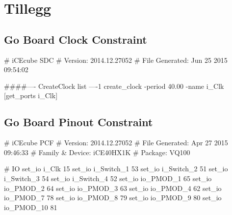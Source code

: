 \appendix

\section{Tillegg}

\subsection{Go Board Clock Constraint}
\begin{verilogcode}
# iCEcube SDC                                               
# Version:            2014.12.27052                         
# File Generated:     Jun 25 2015 09:54:02                  

####---- CreateClock list ----1
create_clock  -period 40.00 -name {i_Clk} [get_ports {i_Clk}] 
\end{verilogcode}

\subsection{Go Board Pinout Constraint}
\begin{verilogcode}
# iCEcube PCF                                               
# Version:            2014.12.27052                         
# File Generated:     Apr 27 2015 09:46:33                  
# Family & Device:    iCE40HX1K                             
# Package:            VQ100                                 

# IO
set_io i_Clk 15
set_io i_Switch_1 53
set_io i_Switch_2 51
set_io i_Switch_3 54
set_io i_Switch_4 52
set_io io_PMOD_1 65
set_io io_PMOD_2 64
set_io io_PMOD_3 63
set_io io_PMOD_4 62
set_io io_PMOD_7 78
set_io io_PMOD_8 79
set_io io_PMOD_9 80
set_io io_PMOD_10 81
\end{verilogcode}

